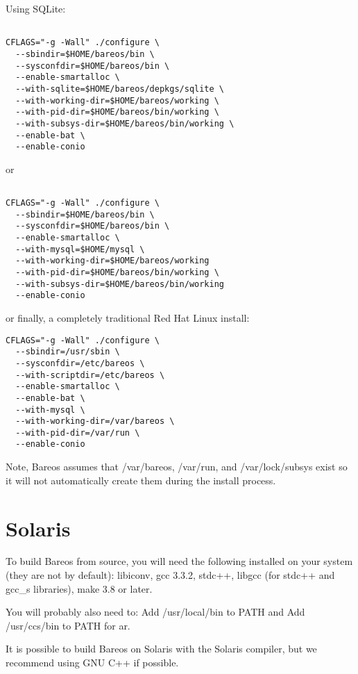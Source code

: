 Using SQLite:

\footnotesize
\begin{verbatim}

CFLAGS="-g -Wall" ./configure \
  --sbindir=$HOME/bareos/bin \
  --sysconfdir=$HOME/bareos/bin \
  --enable-smartalloc \
  --with-sqlite=$HOME/bareos/depkgs/sqlite \
  --with-working-dir=$HOME/bareos/working \
  --with-pid-dir=$HOME/bareos/bin/working \
  --with-subsys-dir=$HOME/bareos/bin/working \
  --enable-bat \
  --enable-conio
\end{verbatim}
\normalsize

or

\footnotesize
\begin{verbatim}

CFLAGS="-g -Wall" ./configure \
  --sbindir=$HOME/bareos/bin \
  --sysconfdir=$HOME/bareos/bin \
  --enable-smartalloc \
  --with-mysql=$HOME/mysql \
  --with-working-dir=$HOME/bareos/working
  --with-pid-dir=$HOME/bareos/bin/working \
  --with-subsys-dir=$HOME/bareos/bin/working
  --enable-conio
\end{verbatim}
\normalsize

or finally, a completely traditional Red Hat Linux install:

\footnotesize
\begin{verbatim}
CFLAGS="-g -Wall" ./configure \
  --sbindir=/usr/sbin \
  --sysconfdir=/etc/bareos \
  --with-scriptdir=/etc/bareos \
  --enable-smartalloc \
  --enable-bat \
  --with-mysql \
  --with-working-dir=/var/bareos \
  --with-pid-dir=/var/run \
  --enable-conio
\end{verbatim}
\normalsize

Note, Bareos assumes that /var/bareos, /var/run, and /var/lock/subsys exist so
it will not automatically create them during the install process.

\section{Solaris}

To build Bareos from source, you will need the following installed on your
system (they are not by default): libiconv, gcc 3.3.2, stdc++, libgcc (for
stdc++ and gcc\_s libraries), make 3.8 or later.

You will probably also need to: Add /usr/local/bin to PATH and Add
/usr/ccs/bin to PATH for ar.

It is possible to build Bareos on Solaris with the Solaris compiler, but
we recommend using GNU C++ if possible.

